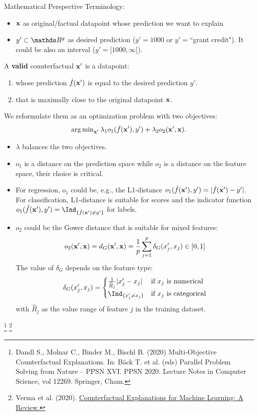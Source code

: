 \documentclass[11pt,compress,t,notes=noshow, xcolor=table]{beamer}
\begin{document}
\begin{vbframe}{Mathematical Perspective}
	Terminology: 
	\begin{itemize}
		\item $\xv$ as original/factual datapoint whose prediction we want to explain
		\item $y' \subset \R^g$ as desired prediction ($y' = 1000$ or $y' = $``grant credit"). It could be also an interval ($y' = [1000, \infty[$).
	\end{itemize}
	\vspace{0.3cm}
	A \textbf{valid} counterfactual $\xv'$ is a datapoint: 
	\begin{enumerate}
		\item whose prediction $\fh(\xv')$ is equal to the desired prediction $y'$. 
		\item that is maximally close to the original datapoint $\xv$.
	\end{enumerate}
	We reformulate them as an optimization problem with two objectives: 
	\begin{equation}
		\argmin_{\xv'} \lambda_1 o_1(\fh(\xv'), y') + \lambda_2 o_2(\xv', \xv).
		\label{eq:optim}
	\end{equation}
	\begin{itemize}
		\item $\lambda$ balances the two objectives.
		\item $o_1$ is a distance on the prediction space while $o_2$ is a distance on the feature space, their choice is critical.
		
		\framebreak
		
		\item For regression, $o_1$ could be, e.g., the L1-distance $o_1(\fh(\xv'), y') = |\fh(\xv')-y'|$. \\For classification, L1-distance is suitable for scores and the indicator function $o_1(\fh(\xv'), y') = \Ind_{\{ \fh(\xv') \neq y' \}}$ for labels. 
		\item $o_2$ could be the Gower distance that is suitable for mixed features: 
		$$o_2(\xv', \xv) = \Gower(\xv', \xv) = \frac{1}{p}\sum_{j = 1}^{p} \delta_G(x'_j, x_j)	\in [0, 1]$$
		The value of $\delta_G$ depends on the feature type:
		\begin{equation*}
		\delta_G(x'_j, x_j) = 
		\begin{cases}
		\frac{1}{\widehat{R}_j}|x_j'- x_j| & \text{if $x_j$ is numerical} \\
		\Ind_{\{ x_j' \neq x_j \}} & \text{if $x_j$ is categorical}
		\end{cases}
		\end{equation*}
		with $\widehat{R}_j$ as the value range of feature $j$ in the training dataset. 
	\end{itemize}
\footnote[frame]{Dandl S., Molnar C., Binder M., Bischl B. (2020) Multi-Objective Counterfactual Explanations. In: Bäck T. et al. (eds) Parallel Problem Solving from Nature – PPSN XVI. PPSN 2020. Lecture Notes in Computer Science, vol 12269. Springer, Cham.}
\footnote[frame]{Verma et al. (2020). \href{https://arxiv.org/pdf/2010.10596.pdf}{Counterfactual Explanations for Machine Learning: A Review.}}
\end{vbframe}
\end{document}
